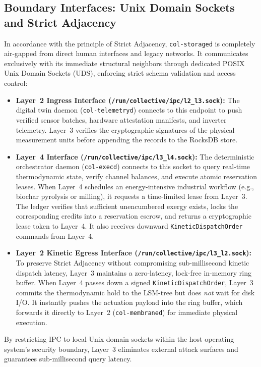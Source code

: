 \subsection{Boundary Interfaces: Unix Domain Sockets and Strict Adjacency}

In accordance with the principle of Strict Adjacency, \texttt{col-storaged} is completely air-gapped from direct human interfaces and legacy networks. It communicates exclusively with its immediate structural neighbors through dedicated POSIX Unix Domain Sockets (UDS), enforcing strict schema validation and access control:

\begin{itemize}
  \item \textbf{Layer~2 Ingress Interface (\texttt{/run/collective/ipc/l2\_l3.sock}):} The digital twin daemon (\texttt{col-telemetryd}) connects to this endpoint to push verified sensor batches, hardware attestation manifests, and inverter telemetry. Layer~3 verifies the cryptographic signatures of the physical measurement units before appending the records to the RocksDB store.
  \item \textbf{Layer~4 Interface (\texttt{/run/collective/ipc/l3\_l4.sock}):} The deterministic orchestrator daemon (\texttt{col-execd}) connects to this socket to query real-time thermodynamic state, verify channel balances, and execute atomic reservation leases. When Layer~4 schedules an energy-intensive industrial workflow (e.g., biochar pyrolysis or milling), it requests a time-limited lease from Layer~3. The ledger verifies that sufficient unencumbered exergy exists, locks the corresponding credits into a reservation escrow, and returns a cryptographic lease token to Layer~4. It also receives downward \texttt{KineticDispatchOrder} commands from Layer~4.
  \item \textbf{Layer~2 Kinetic Egress Interface (\texttt{/run/collective/ipc/l3\_l2.sock}):} To preserve Strict Adjacency without compromising sub-millisecond kinetic dispatch latency, Layer~3 maintains a zero-latency, lock-free in-memory ring buffer. When Layer~4 passes down a signed \texttt{KineticDispatchOrder}, Layer~3 commits the thermodynamic hold to the LSM-tree but does \textit{not} wait for disk I/O. It instantly pushes the actuation payload into the ring buffer, which forwards it directly to Layer~2 (\texttt{col-membraned}) for immediate physical execution.
\end{itemize}

By restricting IPC to local Unix domain sockets within the host operating system's security boundary, Layer~3 eliminates external attack surfaces and guarantees sub-millisecond query latency.

